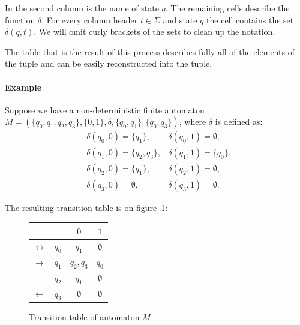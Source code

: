 \documentclass{ctuthesis}
\begin{document}

In the second column is the name of state $q$. The remaining cells describe the function $\delta$. For every column header $t \in \Sigma$ and state $q$ the cell contains the set $\delta(q, t)$. We will omit curly brackets of the sets to clean up the notation. 

The table that is the result of this process describes fully all of the elements of the tuple and can be easily reconstructed into the tuple.

\paragraph{Example}
Suppose we have a non-deterministic finite automaton $M = (\{q_0, q_1, q_2, q_3\}, \{0,1\}, \delta, \{q_0, q_1\}, \{q_0, q_3\})$, where $\delta$ is defined as:
\begin{align*}
	&\delta(q_0, 0) = \{q_1\}, &\delta(q_0, 1) = \emptyset, \\
	&\delta(q_1, 0) = \{q_2, q_3\}, &\delta(q_1, 1) = \{q_0\}, \\
	&\delta(q_2, 0) = \{q_1\}, &\delta(q_2, 1) = \emptyset, \\
	&\delta(q_3, 0) = \emptyset, &\delta(q_3, 1) = \emptyset. 
\end{align*}

The resulting transition table is on figure~\ref{fig:trans-table}:

\begin{figure}[H]
\begin{ctucolortab}
\begin{tabular}{cc|cc}
	&&$0$ & $1$ \\\hline
	$\leftrightarrow$ & $q_0$ & $q_1$ & $\emptyset$ \\
	$\rightarrow$ & $q_1$ & $q_2,q_3$ & $q_0$ \\
	& $q_2$ & $q_1$ & $\emptyset$ \\
	$\leftarrow$ & $q_3$ & $\emptyset$ & $\emptyset$
\end{tabular}
\end{ctucolortab}
\caption{Transition table of automaton $M$}
\label{fig:trans-table}
\end{figure}
\end{document}
